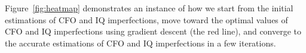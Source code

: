 Figure~\ref{fig:heatmap} demonstrates an instance of how we start from the initial estimations of CFO and IQ imperfections, move toward the optimal values of CFO and IQ imperfections using gradient descent (the red line), and converge to the accurate estimations of CFO and IQ imperfections in a few iterations.


